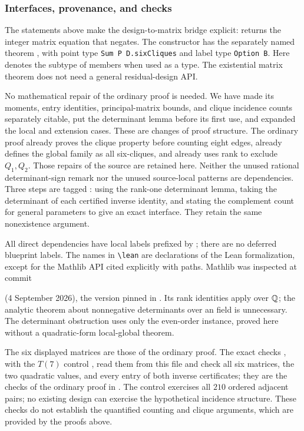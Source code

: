 \begin{mergedproofsection}
\subsubsection{Interfaces, provenance, and checks}

The statements above make the design-to-matrix bridge explicit:
 returns the integer matrix equation that
 negates. The constructor
 has the separately named theorem
, with point type \texttt{Sum P D.sixCliques} and label type
\texttt{Option B}. Here  denotes the subtype of
members when used as a type. The existential matrix theorem does
not need a general residual-design API.

No mathematical repair of the ordinary proof is needed.
We have made its moments, entry identities, principal-matrix bounds,
and clique incidence counts separately citable, put the determinant
lemma before its first use, and expanded the local and extension
cases. These are changes of proof structure. The ordinary
proof already proves the clique property before counting eight
edges, already defines the global family as all six-cliques, and
already uses rank to exclude $Q_1,Q_2$. Those repairs of the source
are retained here. Neither the unused rational determinant-sign
remark nor the unused source-local patterns are dependencies.
Three steps are tagged \new: using the rank-one determinant lemma,
taking the determinant of each certified inverse identity, and
stating the complement count for general parameters to give
 an exact interface. They retain the same
nonexistence argument.

All direct dependencies have local labels prefixed by
; there are no deferred blueprint labels. The names in
\verb|\lean| are declarations of the Lean formalization, except for the
Mathlib API cited explicitly with paths. Mathlib
was inspected at commit
\par\noindent{}\par\noindent
(4 September 2026), the version pinned in .
Its rank identities apply over ${\mathbb Q}$; the analytic theorem about
nonnegative determinants over an  field is unnecessary.
The determinant obstruction uses only the even-order instance,
proved here without a quadratic-form local-global theorem.

The six displayed matrices are those of the ordinary proof. The exact
checks , with the $T(7)$
control , read them from this file and check all six
matrices, the two quadratic values, and every entry of both inverse
certificates; they are the checks of the ordinary proof in
. The control
exercises all $210$ ordered adjacent pairs; no existing design can
exercise the hypothetical incidence structure. These checks do not
establish the quantified counting and clique arguments, which are
provided by the proofs above.
\end{mergedproofsection}
